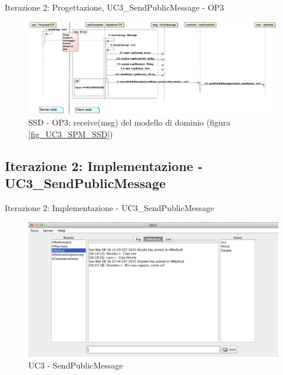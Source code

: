 \begin{frame} {Iterazione 2: Progettazione, UC3\_SendPublicMessage - OP3}
   \begin{figure}
     \includegraphics[scale=0.14]{image_astah/Iteration_2_DesignModel/UC3_SendPublicMessage_SSD_3_receiveMsg.png}{\centering}
     \caption{SSD - OP3: receive(msg) del modello di dominio (figura \ref{fig_UC3_SPM_SSD})}
     \label{fig_UC3_SSD_SRM_3} 
   \end{figure}
\end{frame}

\subsection{Iterazione 2: Implementazione - UC3\_SendPublicMessage}
\begin{frame} {Iterazione 2: Implementazione - UC3\_SendPublicMessage}
   \begin{figure}
    \includegraphics[scale=0.32]{image_implementation/uc3/9.png}{\centering}
    \caption{UC3 - SendPublicMessage }
   \end{figure}
 \end{frame}

